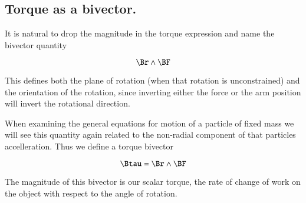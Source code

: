 \documentclass{article}      %
\begin{document}
\subsection{Torque as a bivector.}

It is natural to drop the magnitude in the torque expression and name the
bivector quantity

\[
   \Br \wedge \BF
\]

This defines both the plane of rotation (when that rotation is unconstrained) and the orientation of the rotation, since inverting either the force or the arm position will invert the rotational direction.

When examining the general equations for motion of a particle of fixed mass we will see this quantity again related to the non-radial component of that particles accelleration.  Thus we define a torque bivector

\[
\Btau = \Br \wedge \BF
\]

The magnitude of this bivector is our scalar torque, the rate of change of work on the object with respect to the angle of rotation.
\end{document}
